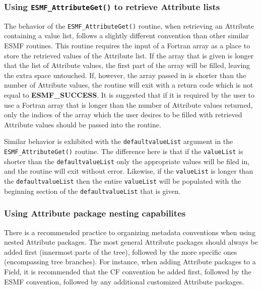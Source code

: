 \subsubsection{Using {\tt ESMF\_AttributeGet()} to retrieve Attribute lists}

The behavior of the {\tt ESMF\_AttributeGet()} routine, when retrieving an Attribute containing a value list, follows a slightly different convention than other similar ESMF routines.  This routine requires the input of a Fortran array as a place to store the retrieved values of the Attribute list.  If the array that is given is longer that the list of Attribute values, the first part of the array will be filled, leaving the extra space untouched.  If, however, the array passed in is shorter than the number of Attribute values, the routine will exit with a return code which is not equal to {\bf ESMF\_SUCCESS}.  It is suggested that if it is required by the user to use a Fortran array that is longer than the number of Attribute values returned, only the indices of the array which the user desires to be filled with retrieved Attribute values should be passed into the routine.  
  
\begin{sloppypar}
Similar behavior is exhibited with the {\tt defaultvalueList} argument in the {\tt ESMF\_AttributeGet()} routine.  The difference here is that if the {\tt valueList} is shorter than the {\tt defaultvalueList} only the appropriate values will be filed in, and the routine will exit without error.  Likewise, if the {\tt valueList} is longer than the {\tt defaultvalueList} then the entire {\tt valueList} will be populated with the beginning section of the {\tt defaultvalueList} that is given.  
\end{sloppypar}

\subsubsection{Using Attribute package nesting capabilites}

There is a recommended practice to organizing metadata conventions when using nested Attribute packages.  The most general Attribute packages should always be added first (innermost parts of the tree), followed by the more specific ones (encompassing tree branches).  For instance, when adding Attribute packages to a Field, it is recommended that the CF convention be added first, followed by the ESMF convention, followed by any additional customized Attribute packages.  

